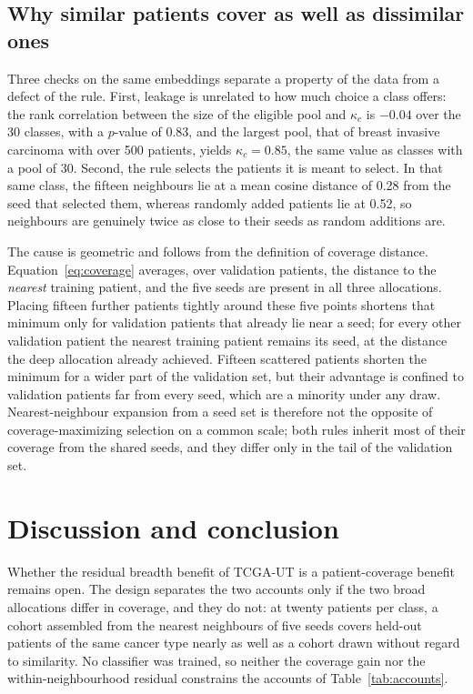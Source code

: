 \subsection{Why similar patients cover as well as dissimilar ones}
\label{sec:diagnosis}
Three checks on the same embeddings separate a property of the data from a defect of the rule. First, leakage is unrelated to how much choice a class offers: the rank correlation between the size of the eligible pool and $\kappa_c$ is $-0.04$ over the 30 classes, with a $p$-value of 0.83, and the largest pool, that of breast invasive carcinoma with over 500 patients, yields $\kappa_c=0.85$, the same value as classes with a pool of 30. Second, the rule selects the patients it is meant to select. In that same class, the fifteen neighbours lie at a mean cosine distance of 0.28 from the seed that selected them, whereas randomly added patients lie at 0.52, so neighbours are genuinely twice as close to their seeds as random additions are.

The cause is geometric and follows from the definition of coverage distance. Equation~\eqref{eq:coverage} averages, over validation patients, the distance to the \emph{nearest} training patient, and the five seeds are present in all three allocations. Placing fifteen further patients tightly around these five points shortens that minimum only for validation patients that already lie near a seed; for every other validation patient the nearest training patient remains its seed, at the distance the deep allocation already achieved. Fifteen scattered patients shorten the minimum for a wider part of the validation set, but their advantage is confined to validation patients far from every seed, which are a minority under any draw. Nearest-neighbour expansion from a seed set is therefore not the opposite of coverage-maximizing selection on a common scale; both rules inherit most of their coverage from the shared seeds, and they differ only in the tail of the validation set.

\section{Discussion and conclusion}
\label{sec:discussion}
Whether the residual breadth benefit of TCGA-UT is a patient-coverage benefit remains open. The design separates the two accounts only if the two broad allocations differ in coverage, and they do not: at twenty patients per class, a cohort assembled from the nearest neighbours of five seeds covers held-out patients of the same cancer type nearly as well as a cohort drawn without regard to similarity. No classifier was trained, so neither the coverage gain nor the within-neighbourhood residual constrains the accounts of Table~\ref{tab:accounts}.

